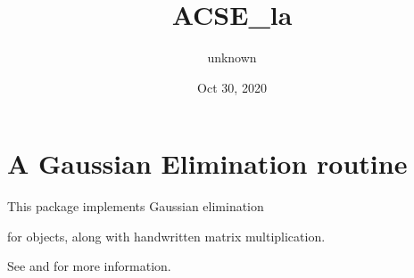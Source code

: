 \documentclass[letterpaper,10pt,english]{sphinxmanual}
\title{ACSE\_la}
\date{Oct 30, 2020}
\author{unknown}
\begin{document}
\pagestyle{empty}
\sphinxmaketitle
\pagestyle{plain}
\sphinxtableofcontents
\pagestyle{normal}
\label{\detokenize{index::doc}}



\chapter{A Gaussian Elimination routine}
\label{\detokenize{index:a-gaussian-elimination-routine}}
This package implements Gaussian elimination %
\begin{footnote}[1]\sphinxAtStartFootnote
{}
%
\end{footnote} for  objects, along with hand\sphinxhyphen{}written matrix multiplication.

See {\hyperref[\detokenize{index:acse_la.gauss}]{}} and  for more information.

\label{\detokenize{index:module-acse_la}}
\end{document}
